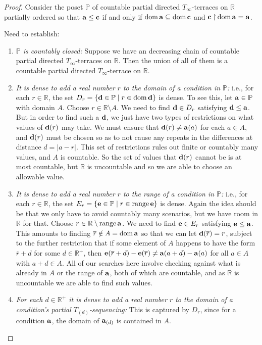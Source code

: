 \documentclass{amsart}
\theoremstyle{definition}
\theoremstyle{remark}
\renewcommand{\P}{\mathbb{P}}
\newcommand{\R}{\mathbb{R}}
\renewcommand{\c}{\mathfrak{c}}
\DeclareMathOperator{\ran}{range}
\DeclareMathOperator{\dom}{dom}
\newcommand{\st}{\; | \;}
\newcommand{\set}[2]{\left\{#1\st #2 \right\}}
\newcommand{\rest}{\mathbin{\upharpoonright}}
\renewcommand{\a}{\textup{\textbf{a}}}
\renewcommand{\c}{\textup{\textbf{c}}}
\renewcommand{\d}{\textup{\textbf{d}}}
\newcommand{\e}{\textup{\textbf{e}}}
\renewcommand{\r}{\overline r}
\begin{document}
\begin{proof}
Consider the poset $\P$ of countable partial directed $T_\infty$-terraces on $\R$ partially ordered so that $\a \leq \c$ if and only if $\dom \a \subseteq \dom \c$ and $\c \rest \dom \a = \a$.

Need to establish: \begin{enumerate}
	\item \emph{$\P$ is countably closed:} Suppose we have an decreasing chain of countable partial directed $T_\infty$-terraces on $\R$. Then the union of all of them is a countable partial directed $T_\infty$-terrace on $\R$.
	\item \emph{It is dense to add a real number $r$ to the domain of a condition in $\P$:} i.e., for each $r \in \R$, the set $D_r=\set{\d \in \P}{r \in \dom \d }$ is dense. To see this, let $\a \in \P$ with domain $A$. Choose $r \in \R \setminus A$. We need to find $\d \in D_r$ satisfying $\d \leq \a$. But in order to find such a $\d$, we just have two types of restrictions on what values of $\d(r)$ may take. We must ensure that $\d(r) \neq \a(a)$ for each $a \in A$, and $\d(r)$ must be chosen so as to not cause any repeats in the differences at distance $d = |a-r|$. This set of restrictions rules out finite or countably many values, and $A$ is countable. So the set of values that $\d(r)$ cannot be is at most countable, but $\R$ is uncountable and so we are able to choose an allowable value.
	\item \emph{It is dense to add a real number $r$ to the range of a condition in $\P$:} i.e., for each $r \in \R$, the set $E_r=\set{\e \in \P}{r \in \ran \e }$ is dense. Again the idea should be that we only have to avoid countably many scenarios, but we have room in $\R$ for that. Choose $r \in \R \setminus \ran \a$. We need to find $\e \in E_r$ satisfying $\e \leq \a$. This amounts to finding $\r \notin A = \dom \a$ so that we can let $\d(\overline r)=r$, subject to the further restriction that if some element of $A$ happens to have the form $\r +d$ for some $d \in \R^+$, then $\e(\r+d)-\e(\r) \neq \a(a+d)-\a(a)$ for all $a\in A$ with $a+d \in A$. All of our searches here involve checking against what is already in $A$ or the range of $\a$, both of which are countable, and as $\R$ is uncountable we are able to find such values.
	\item \label{item:StepFunctionDomainDense} \emph{For each $d \in \R^+$ it is dense to add a real number $r$ to the domain of a condition's partial $T_{(d)}$-sequencing:} This is captured by $D_r$, since for a condition $\a$, the domain of $\a_{(d)}$ is contained in $A$.

\end{enumerate}
\end{proof}
\end{document}
